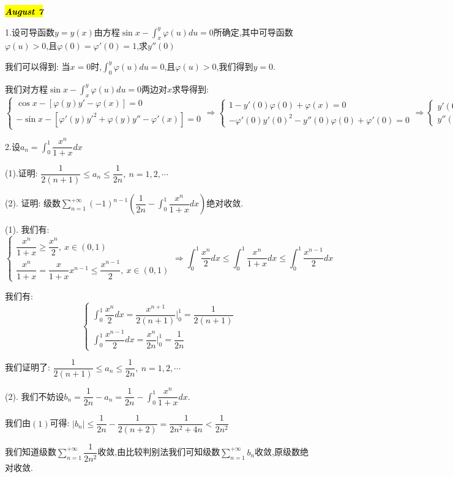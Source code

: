 \hl{\textbf{\textit{August 7}}}

1.设可导函数$y=y(x)$由方程$\sin x-\int_{x}^{y}\varphi(u)du=0$所确定,其中可导函数$\varphi(u)>0$,且$\varphi(0)=\varphi'(0)=1$,求$y''(0)$
\begin{solution}

	我们可以得到:  当$x=0$时,$\int_{0}^{y}\varphi(u)du=0$,且$\varphi(u)>0$,我们得到$y=0$.
	
	我们对方程$\sin x-\int_{x}^{y}\varphi(u)du=0$两边对$x$求导得到:  
	$$\left\lbrace
	\begin{array}{l}
		\cos x-[\varphi(y)y'-\varphi(x)]=0\\
		-\sin x-[\varphi'(y)y'^2+\varphi(y)y''-\varphi'(x)]=0
	\end{array}
	\right. \Rightarrow \left\lbrace
	\begin{array}{l}
		1-y'(0)\varphi(0)+\varphi(x)=0\\
		-\varphi'(0)y'(0)^2-y''(0)\varphi(0)+\varphi'(0)=0
	\end{array}
	\right. \Rightarrow \left\lbrace
	\begin{array}{l}
		y'(0)=2\\
		y''(0)=-3
	\end{array}
	\right. $$
\end{solution}

2.设$a_{n}=\int_{0}^{1}\dfrac{x^n}{1+x}dx$

(1).证明:  $\dfrac{1}{2(n+1)}\leq a_{n}\leq \dfrac{1}{2n},\ n=1,2,\cdots$

(2). 证明:  级数$\sum\limits_{n=1}^{+\infty}(-1)^{n-1}(\dfrac{1}{2n}-\int_{0}^{1}\dfrac{x^n}{1+x}dx)$绝对收敛.
\begin{solution}

	(1). 我们有:  $$\left\lbrace
	\begin{array}{l}
		\dfrac{x^n}{1+x}\geq \dfrac{x^n}{2},\ x\in(0,1)\\
		\dfrac{x^n}{1+x}=\dfrac{x}{1+x}x^{n-1}\leq\dfrac{x^{n-1}}{2},\ x\in(0,1)
	\end{array}
	\right. \Rightarrow \int_{0}^{1}\dfrac{x^n}{2}dx\leq \int_{0}^{1}\dfrac{x^n}{1+x}dx\leq \int_{0}^{1}\dfrac{x^{n-1}}{2}dx$$
	
	我们有:  $$\left\lbrace
	\begin{array}{l}
		\int_{0}^{1}\dfrac{x^n}{2}dx=\dfrac{x^{n+1}}{2(n+1)}|_{0}^{1}=\dfrac{1}{2(n+1)}\\
		\int_{0}^{1}\dfrac{x^{n-1}}{2}dx=\dfrac{x^{n}}{2n}|_{0}^{1}=\dfrac{1}{2n}
	\end{array}
	\right. $$
	
	我们证明了:  $\dfrac{1}{2(n+1)}\leq a_{n}\leq \dfrac{1}{2n},\ n=1,2,\cdots$
	
	(2). 我们不妨设$b_{n}=\dfrac{1}{2n}-a_{n}=\dfrac{1}{2n}-\int_{0}^{1}\dfrac{x^n}{1+x}dx$.
	
	我们由$(1)$可得:  $|b_{n}|\leq \dfrac{1}{2n}-\dfrac{1}{2(n+2)}=\dfrac{1}{2n^2+4n}<\dfrac{1}{2n^2}$
	
	我们知道级数$\sum\limits_{n=1}^{+\infty}\dfrac{1}{2n^2}$收敛,由比较判别法我们可知级数$\sum\limits_{n=1}^{+\infty}b_{n}$收敛,原级数绝对收敛.
\end{solution}

